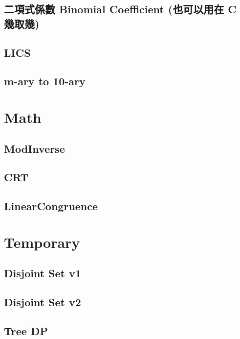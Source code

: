     \subsection{二項式係數 Binomial Coefficient (也可以用在 C 幾取幾)}
        
    \subsection{LICS}
        
    \subsection{m-ary to 10-ary}
        

\section{Math}
    \subsection{ModInverse}
        
    \subsection{CRT}
        
    \subsection{LinearCongruence}
        


\section{Temporary}
    \subsection{Disjoint Set v1}
        
    \subsection{Disjoint Set v2}
        
    \subsection{Tree DP}
        